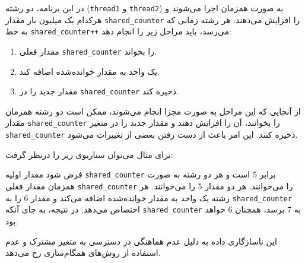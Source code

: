 \begin{enumerate}
\begin{qsolve}
		در این برنامه، دو رشته (\texttt{thread1} و \texttt{thread2}) به صورت همزمان اجرا می‌شوند و هرکدام یک میلیون بار مقدار \texttt{shared\_counter} را افزایش می‌دهند. هر رشته زمانی که به خط \texttt{shared\_counter++} می‌رسد، باید مراحل زیر را انجام دهد:
		
		\begin{enumerate}
			\item مقدار فعلی \texttt{shared\_counter} را بخواند.
			\item یک واحد به مقدار خوانده‌شده اضافه کند.
			\item مقدار جدید را در \texttt{shared\_counter} ذخیره کند.
		\end{enumerate}
		
		از آنجایی که این مراحل به صورت مجزا انجام می‌شوند، ممکن است دو رشته همزمان مقدار \texttt{shared\_counter} را بخوانند، آن را افزایش دهند و مقدار جدید را در متغیر \texttt{shared\_counter} ذخیره کنند. این امر باعث از دست رفتن بعضی از تغییرات می‌شود.
		
		
		برای مثال می‌توان سناریوی زیر را درنظر گرفت:
		
		فرض شود مقدار اولیه \texttt{shared\_counter} برابر 5 است و هر دو رشته به صورت همزمان مقدار فعلی \texttt{shared\_counter} را می‌خوانند. هر دو مقدار 5 را می‌خوانند. هر رشته یک واحد به مقدار خوانده‌شده اضافه می‌کند و مقدار 6 را به \texttt{shared\_counter} اختصاص می‌دهد. در نتیجه، به جای آنکه \texttt{shared\_counter} به 7 برسد، همچنان 6 خواهد بود.
		
		این ناسازگاری داده به دلیل عدم هماهنگی در دسترسی به متغیر مشترک و عدم استفاده از روش‌های همگام‌سازی رخ می‌دهد.
	\end{qsolve}

\end{enumerate}